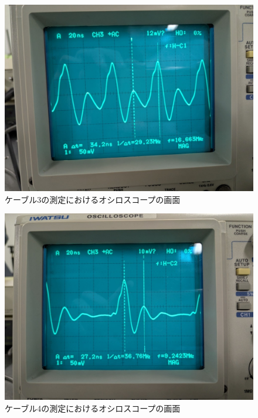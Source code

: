 \documentclass{jarticle}
\begin{document}
\begin{figure}[H]
  \begin{center}
    \includegraphics[scale=0.3]{cable3_result_picture.jpg}
    \caption{ケーブル3の測定におけるオシロスコープの画面}
    \label{fg:cable3}
  \end{center}
\end{figure}

\begin{figure}[H]
  \begin{center}
    \includegraphics[scale=0.3]{cable4_result_picture.jpg}
    \caption{ケーブル4の測定におけるオシロスコープの画面}
    \label{fg:cable4}
  \end{center}
\end{figure}
\end{document}
